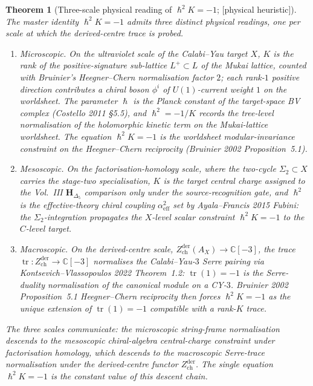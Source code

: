 \documentclass[11pt,reqno]{amsart}
\theoremstyle{plain}
\newtheorem{theorem}{Theorem}[section]
\theoremstyle{definition}
\theoremstyle{remark}
\providecommand{\ClaimStatusHeuristic}{\textnormal{[physical heuristic]}}
\DeclareMathOperator{\tr}{tr}
\newcommand{\Cbb}{\mathbb{C}}
\newcommand{\bfH}{\mathbf{H}}
\newcommand{\hbar}{{\hslash}}
\begin{document}
\begin{theorem}[Three-scale physical reading of $\hbar^2 K = -1$; \ClaimStatusHeuristic]
\label{thm:three-scale}
The master identity $\hbar^2 K = -1$ admits three distinct physical readings, one per scale at which the derived-centre trace is probed.
\begin{enumerate}[label=\textup{(\arabic*)}]
  \item \emph{Microscopic.} On the ultraviolet scale of the Calabi--Yau target $X$, $K$ is the rank of the positive-signature sub-lattice $L^+ \subset L$ of the Mukai lattice, counted with Bruinier's Heegner--Chern normalisation factor $2$; each rank-$1$ positive direction contributes a chiral boson $\phi^i$ of $U(1)$-current weight $1$ on the worldsheet. The parameter $\hbar$ is the Planck constant of the target-space BV complex (Costello 2011 \S5.5), and $\hbar^2 = -1/K$ records the tree-level normalisation of the holomorphic kinetic term on the Mukai-lattice worldsheet. The equation $\hbar^2 K = -1$ is the worldsheet modular-invariance constraint on the Heegner--Chern reciprocity (Bruinier 2002 Proposition~5.1).
  \item \emph{Mesoscopic.} On the factorisation-homology scale, where the two-cycle $\Sigma_2 \subset X$ carries the stage-two specialisation, $K$ is the target central charge assigned to the Vol.~III $\bfH_{\Delta_5}$ comparison only under the source-recognition gate, and $\hbar^2$ is the effective-theory chiral coupling $\alpha_{\mathrm{eff}}^2$ set by Ayala--Francis 2015 Fubini: the $\Sigma_2$-integration propagates the $X$-level scalar constraint $\hbar^2 K = -1$ to the $C$-level target.
  \item \emph{Macroscopic.} On the derived-centre scale, $Z^{\mathrm{der}}_{\mathrm{ch}}(A_X) \to \Cbb[-3]$, the trace $\tr: Z^{\mathrm{der}}_{\mathrm{ch}} \to \Cbb[-3]$ normalises the Calabi--Yau-$3$ Serre pairing via Kontsevich--Vlassopoulos 2022 Theorem~1.2: $\tr(1) = -1$ is the Serre-duality normalisation of the canonical module on a CY-$3$. Bruinier 2002 Proposition~5.1 Heegner--Chern reciprocity then forces $\hbar^2 K = -1$ as the unique extension of $\tr(1) = -1$ compatible with a rank-$K$ trace.
\end{enumerate}
The three scales communicate: the microscopic string-frame normalisation descends to the mesoscopic chiral-algebra central-charge constraint under factorisation homology, which descends to the macroscopic Serre-trace normalisation under the derived-centre functor $Z^{\mathrm{der}}_{\mathrm{ch}}$. The single equation $\hbar^2 K = -1$ is the constant value of this descent chain.
\end{theorem}
\end{document}
